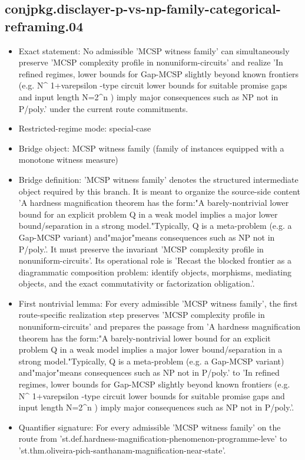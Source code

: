 \documentclass[11pt]{article}
\begin{document}
\subsection*{conjpkg.disclayer-p-vs-np-family-categorical-reframing.04}
\begin{itemize}
\item Exact statement: No admissible 'MCSP witness family' can simultaneously preserve 'MCSP complexity profile in nonuniform-circuits' and realize 'In refined regimes, lower bounds for Gap-MCSP slightly beyond known frontiers (e.g. N\textasciicircum{} 1+varepsilon -type circuit lower bounds for suitable promise gaps and input length N=2\textasciicircum{}n ) imply major consequences such as NP not in P/poly.' under the current route commitments.
\item Restricted-regime mode: special-case
\item Bridge object: MCSP witness family (family of instances equipped with a monotone witness measure)
\item Bridge definition: 'MCSP witness family' denotes the structured intermediate object required by this branch. It is meant to organize the source-side content 'A hardness magnification theorem has the form:"A barely-nontrivial lower bound for an explicit problem Q in a weak model implies a major lower bound/separation in a strong model."Typically, Q is a meta-problem (e.g. a Gap-MCSP variant) and"major"means consequences such as NP not in P/poly.'. It must preserve the invariant 'MCSP complexity profile in nonuniform-circuits'. Its operational role is 'Recast the blocked frontier as a diagrammatic composition problem: identify objects, morphisms, mediating objects, and the exact commutativity or factorization obligation.'.
\item First nontrivial lemma: For every admissible 'MCSP witness family', the first route-specific realization step preserves 'MCSP complexity profile in nonuniform-circuits' and prepares the passage from 'A hardness magnification theorem has the form:"A barely-nontrivial lower bound for an explicit problem Q in a weak model implies a major lower bound/separation in a strong model."Typically, Q is a meta-problem (e.g. a Gap-MCSP variant) and"major"means consequences such as NP not in P/poly.' to 'In refined regimes, lower bounds for Gap-MCSP slightly beyond known frontiers (e.g. N\textasciicircum{} 1+varepsilon -type circuit lower bounds for suitable promise gaps and input length N=2\textasciicircum{}n ) imply major consequences such as NP not in P/poly.'.
\item Quantifier signature: For every admissible 'MCSP witness family' on the route from 'st.def.hardness-magnification-phenomenon-programme-leve' to 'st.thm.oliveira-pich-santhanam-magnification-near-state'.

\end{itemize}
\end{document}
